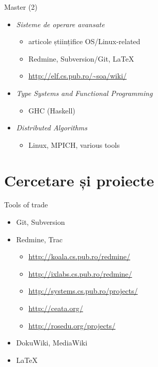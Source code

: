 \documentclass{simple}
\begin{document}
\begin{frame}{Master (2)}
	\begin{itemize}
		\item \textit{Sisteme de operare avansate}
			\begin{itemize}
				\item articole științifice OS/Linux-related
				\item Redmine, Subversion/Git, \LaTeX
				\item \url{http://elf.cs.pub.ro/~soa/wiki/}
			\end{itemize}
		\item \textit{Type Systems and Functional Programming}
			\begin{itemize}
				\item GHC (Haskell)
			\end{itemize}
		\item \textit{Distributed Algorithms}
			\begin{itemize}
				\item Linux, MPICH, various tools
			\end{itemize}
	\end{itemize}
\end{frame}

\section{Cercetare și proiecte}

\frame{\tableofcontents[currentsection]}

\begin{frame}{Tools of trade}
	\begin{itemize}
		\item Git, Subversion
		\item Redmine, Trac
			\begin{itemize}
				\item \url{http://koala.cs.pub.ro/redmine/}
				\item \url{http://ixlabs.cs.pub.ro/redmine/}
				\item \url{http://systems.cs.pub.ro/projects/}
				\item \url{http://ceata.org/}
				\item \url{http://rosedu.org/projects/}
			\end{itemize}
		\item DokuWiki, MediaWiki
		\item \LaTeX
	\end{itemize}
\end{frame}
\end{document}
